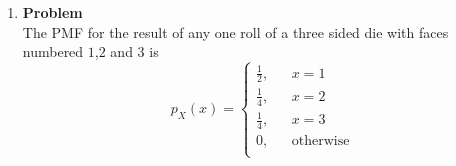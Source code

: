 \documentclass[12pt]{article}
\newenvironment{Ex}{\textbf{Problem}\vspace{.75em}\\}{}
\begin{document}
\begin{enumerate}
\begin{Ex}
\begin{solution}
\begin{enumerate}
\begin{equation}
        \end{equation}
        $P_X(x)$ is chosen first between 1 and 4, so
        $P_X(x)=\frac{1}{4}$. We must choose a value for $Y$ that is
        not more than $X$, so $P_{Y|X}(x,y) = \frac{1}{y_0}$, where $y_0$
        is between the chosen $x$ value and 4. Thus
        \begin{equation}
          \label{eq:5a-sol}
          P_{Y|X}(x|y) = \frac{1}{4y_0}
        \end{equation}
      \item Now we have to do the opposite. The conditional mass
        function of $X$ given that $Y=i$ for $i=1,\ldots,4$ can be
        modeled by
        \begin{equation}
          \label{eq:5b-presol}
          P_{X|Y}(y,x) = \frac{P_{X,Y}(x,y)}{P_Y(y)}
        \end{equation}
        We have $P_{X,Y}(x,y)$ from \cref{eq:5a-sol}, so we must now
        compute $P_Y(y)$ for $y=1,\ldots,4.$. This turns out to be
        \begin{equation}
          \label{eq:5b-p-y}
          P_Y(y) = \sum_{k=1}^4 \frac{k}{4}
        \end{equation}
        Which makes our solution
        \begin{equation}
          \label{eq:5b-sol}
          P_{X|Y}(x,y) = \frac{\frac{1}{4x}}{\sum_{k=y}^4 \frac{k}{4}}
        \end{equation}
      \item No because the value of $Y$ depends on the value of $X$;
        i.e. the value of $X$ gives information about what values $Y$
        can take.
      \end{enumerate}
    \end{solution}
  \end{Ex}
\item
  \begin{Ex}
    The PMF for the result of any one roll of a three sided die with
    faces numbered $1$,$2$ and $3$ is
    \begin{equation*}
      p_X(x) = \left\{
        \begin{aligned}
          \frac{1}{2}, && x=1 \\
          \frac{1}{4}, && x=2 \\
          \frac{1}{4}, && x=3 \\
          0, && \text{otherwise} \\
        \end{aligned} \right.
    \end{equation*}

\end{Ex}
\end{enumerate}
\end{document}

